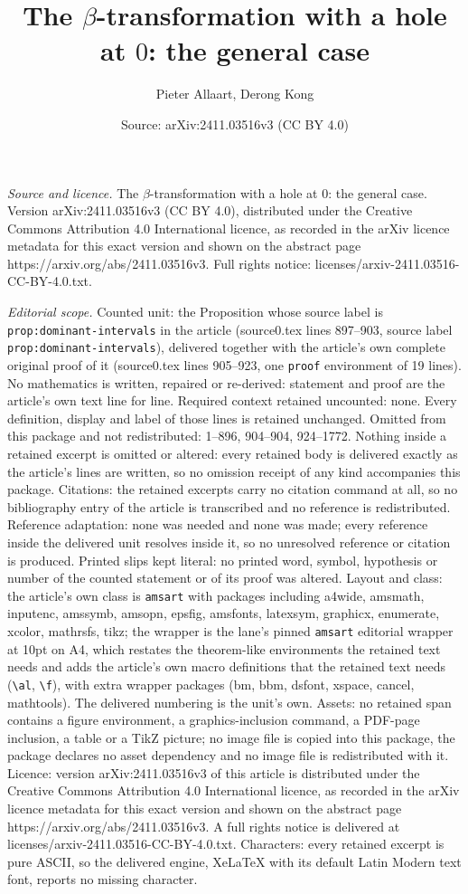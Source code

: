 \documentclass[10pt,a4paper]{amsart}
\title[The $\beta$-transformation with a hole at $0$: the general c]{The $\beta$-transformation with a hole at $0$: the general case}
\author{Pieter Allaart, Derong Kong}
\date{Source: arXiv:2411.03516v3 (CC BY 4.0)}
\begin{document}
\maketitle

\noindent\emph{Source and licence.} The $\beta$-transformation with a hole at $0$: the general case. Version arXiv:2411.03516v3 (CC BY 4.0), distributed under the Creative Commons Attribution 4.0 International licence, as recorded in the arXiv licence metadata for this exact version and shown on the abstract page https://arxiv.org/abs/2411.03516v3. Full rights notice: licenses/arxiv-2411.03516-CC-BY-4.0.txt.\par\smallskip

\noindent\textit{Editorial scope.} Counted unit: the Proposition whose source label is \texttt{prop:dominant-intervals} in the article (source0.tex lines 897--903, source label \texttt{prop:dominant-intervals}), delivered together with the article's own complete original proof of it (source0.tex lines 905--923, one \texttt{proof} environment of 19 lines). No mathematics is written, repaired or re-derived: statement and proof are the article's own text line for line. Required context retained uncounted: none. Every definition, display and label of those lines is retained unchanged. Omitted from this package and not redistributed: 1--896, 904--904, 924--1772. Nothing inside a retained excerpt is omitted or altered: every retained body is delivered exactly as the article's lines are written, so no omission receipt of any kind accompanies this package. Citations: the retained excerpts carry no citation command at all, so no bibliography entry of the article is transcribed and no reference is redistributed. Reference adaptation: none was needed and none was made; every reference inside the delivered unit resolves inside it, so no unresolved reference or citation is produced. Printed slips kept literal: no printed word, symbol, hypothesis or number of the counted statement or of its proof was altered. Layout and class: the article's own class is \texttt{amsart} with packages including a4wide, amsmath, inputenc, amssymb, amsopn, epsfig, amsfonts, latexsym, graphicx, enumerate, xcolor, mathrsfs, tikz; the wrapper is the lane's pinned \texttt{amsart} editorial wrapper at 10pt on A4, which restates the theorem-like environments the retained text needs and adds the article's own macro definitions that the retained text needs (\texttt{\textbackslash al}, \texttt{\textbackslash f}), with extra wrapper packages (bm, bbm, dsfont, xspace, cancel, mathtools). The delivered numbering is the unit's own. Assets: no retained span contains a figure environment, a graphics-inclusion command, a PDF-page inclusion, a table or a TikZ picture; no image file is copied into this package, the package declares no asset dependency and no image file is redistributed with it. Licence: version arXiv:2411.03516v3 of this article is distributed under the Creative Commons Attribution 4.0 International licence, as recorded in the arXiv licence metadata for this exact version and shown on the abstract page https://arxiv.org/abs/2411.03516v3. A full rights notice is delivered at licenses/arxiv-2411.03516-CC-BY-4.0.txt. Characters: every retained excerpt is pure ASCII, so the delivered engine, XeLaTeX with its default Latin Modern text font, reports no missing character.
\end{document}
